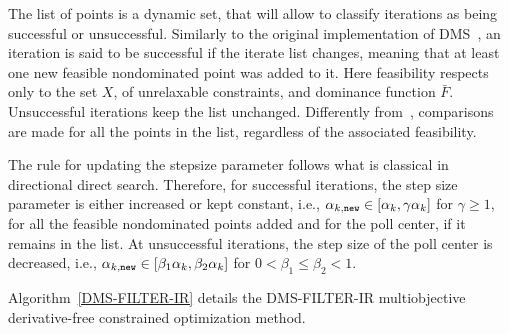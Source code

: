 \documentclass[12pt]{article}
\begin{document}
The list of points is a dynamic set, that will allow to classify
iterations as being successful or unsuccessful. Similarly to the
original implementation of DMS~\cite{custodio2011}, an iteration
is said to be successful if the iterate list changes, meaning that
at least one new feasible nondominated point was added to it. Here
feasibility respects only to the set $X$, of unrelaxable
constraints, and dominance function $\bar{F}$. Unsuccessful
iterations keep the list unchanged. Differently
from~\cite{bigeon2022}, comparisons are made for all the points in
the list, regardless of the associated feasibility.

The rule for updating the stepsize parameter follows what is
classical in directional direct search. Therefore, for successful
iterations, the step size parameter is either increased or kept
constant, i.e., $\alpha_{k,\tt new}\in [\alpha_k,\gamma \alpha_k]$
for $\gamma\geq 1$, for all the feasible nondominated points added
and for the poll center, if it remains in the list. At
unsuccessful iterations, the step size of the poll center is
decreased, i.e., $\alpha_{k,\tt new}\in
[\beta_1\alpha_k,\beta_2\alpha_k]$ for $0<\beta_1\leq \beta_2<1$.

Algorithm~\ref{DMS-FILTER-IR} details the DMS-FILTER-IR
multiobjective derivative-free constrained optimization method.
\end{document}
